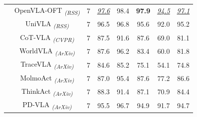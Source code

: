\begin{table}[t]
\begin{tabular}{ccc|cccc|c}
		&OpenVLA-OFT \citep{OpenVLA-OFT-2025} \textsubscript{\textit{(RSS)}}& 7& \underline{\textit{97.6}} & 98.4 & \multicolumn{1}{c}{\textbf{97.9}} & \multicolumn{1}{c|}{\underline{\textit{94.5}}} & \underline{\textit{97.1}}  \\	
		&UniVLA \citep{UniVLA-2025} \textsubscript{\textit{(RSS)}}&7& 96.5  & 96.8  & 95.6  & \multicolumn{1}{c|}{92.0} & 95.2 \\
		&CoT-VLA \citep{CoT-VLA-2025} \textsubscript{\textit{(CVPR)}}&7 & \multicolumn{1}{c}{87.5} & \multicolumn{1}{c}{91.6} & \multicolumn{1}{c}{87.6} & \multicolumn{1}{c|}{69.0} & \multicolumn{1}{c}{81.1} \\
		&WorldVLA \citep{WorldVLA-2025} \textsubscript{\textit{(ArXiv)}}&7& 87.6  & 96.2  & 83.4  & \multicolumn{1}{c|}{60.0} & 81.8 \\	
		&TraceVLA \citep{TraceVLA-2025} \textsubscript{\textit{(ArXiv)}}&7 & \multicolumn{1}{c}{84.6} & \multicolumn{1}{c}{85.2} & \multicolumn{1}{c}{75.1} & \multicolumn{1}{c|}{54.1} & \multicolumn{1}{c}{74.8} \\	
        &MolmoAct \citep{MolmoAct-2025} \textsubscript{\textit{(ArXiv)}}&7 & \multicolumn{1}{c}{87.0} & \multicolumn{1}{c}{95.4} & \multicolumn{1}{c}{87.6} & \multicolumn{1}{c|}{77.2} & \multicolumn{1}{c}{86.6} \\	
        &ThinkAct \citep{ThinkAct-2025} \textsubscript{\textit{(ArXiv)}}&7 & \multicolumn{1}{c}{88.3} & \multicolumn{1}{c}{91.4} & \multicolumn{1}{c}{87.1} & \multicolumn{1}{c|}{70.9} & \multicolumn{1}{c}{84.4} \\
        & PD-VLA \citep{PDVLA-2025} \textsubscript{\textit{(ArXiv)}} &7 & 95.5& 96.7&94.9&91.7&94.7\\
		\midrule[0.5pt]
		

\end{tabular}
\end{table}
